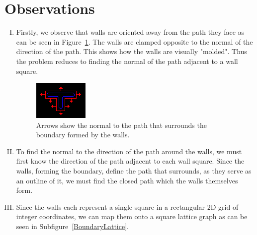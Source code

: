 \section{Observations}
\begin{enumerate}[I.]
\item Firstly, we observe that walls are oriented away from the path they face as can be seen in Figure~\ref{PathNormal}. The walls are clamped opposite to the normal of the direction of the path. This shows how the walls are visually "molded". Thus the problem reduces to finding the normal of the path adjacent to a wall square.  
\begin{figure}[H]
	\centering
	\includegraphics[width=0.4\linewidth]{Image-6.png}
	\caption {Arrows show the normal to the path that surrounds the boundary formed by the walls.\autocite{myself}} \label{PathNormal}
\end{figure}

\item To find the normal to the direction of the path around the walls, we must first know the direction of the path adjacent to each wall square. Since the walls, forming the boundary, define the path that surrounds, as they serve as an outline of it, we must find the closed path which the walls themselves form.\label{ClosedPathObservation}

\item Since the walls each represent a single square in a rectangular 2D grid of integer coordinates, we can map them onto a square lattice graph as can be seen in Subfigure~\ref{BoundaryLattice}.\label{SquareLatticeObservation}


\end{enumerate}
